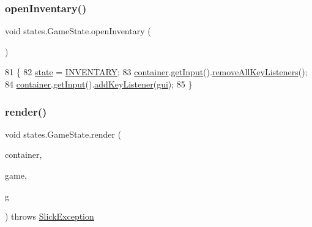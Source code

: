 \subsubsection{\texorpdfstring{open\+Inventary()}{openInventary()}}
{\footnotesize\ttfamily void states.\+Game\+State.\+open\+Inventary (\begin{DoxyParamCaption}{ }\end{DoxyParamCaption})\hspace{0.3cm}{\ttfamily [inline]}}


\begin{DoxyCode}
81                                 \{
82         \mbox{\hyperlink{classstates_1_1_game_state_a5e07b1776e13d009e1a8c6a1e8140d04}{state}} = \mbox{\hyperlink{classstates_1_1_game_state_a4cc6c1ac20c3d3590424e5b199a4663c}{INVENTARY}};
83         \mbox{\hyperlink{classstates_1_1_game_state_a88b0df4b57ada742c53e4e1ee3b25827}{container}}.\mbox{\hyperlink{classorg_1_1newdawn_1_1slick_1_1_game_container_a6042fd06c54872f9f791bd33beffec88}{getInput}}().\mbox{\hyperlink{classorg_1_1newdawn_1_1slick_1_1_input_ae9aa4789e13f1528ae603939684a4237}{removeAllKeyListeners}}();
84         \mbox{\hyperlink{classstates_1_1_game_state_a88b0df4b57ada742c53e4e1ee3b25827}{container}}.\mbox{\hyperlink{classorg_1_1newdawn_1_1slick_1_1_game_container_a6042fd06c54872f9f791bd33beffec88}{getInput}}().\mbox{\hyperlink{classorg_1_1newdawn_1_1slick_1_1_input_af5ad91bb375e8834e1914f441794561b}{addKeyListener}}(\mbox{\hyperlink{namespacegui}{gui}});
85     \}
\end{DoxyCode}
\mbox{\label{classstates_1_1_game_state_a9500cae36bcfef4c7002c7086ef9429d}} 
\subsubsection{\texorpdfstring{render()}{render()}}
{\footnotesize\ttfamily void states.\+Game\+State.\+render (\begin{DoxyParamCaption}\item[{\mbox{\hyperlink{classorg_1_1newdawn_1_1slick_1_1_game_container}{Game\+Container}}}]{container,  }\item[{\mbox{\hyperlink{classorg_1_1newdawn_1_1slick_1_1state_1_1_state_based_game}{State\+Based\+Game}}}]{game,  }\item[{\mbox{\hyperlink{classorg_1_1newdawn_1_1slick_1_1_graphics}{Graphics}}}]{g }\end{DoxyParamCaption}) throws \mbox{\hyperlink{classorg_1_1newdawn_1_1slick_1_1_slick_exception}{Slick\+Exception}}\hspace{0.3cm}{\ttfamily [inline]}}

